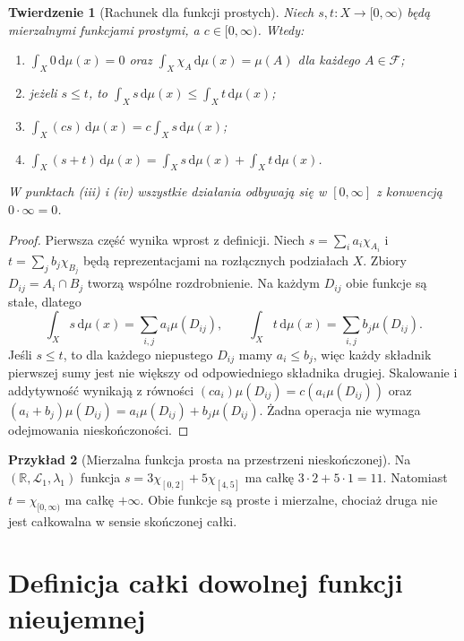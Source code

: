 \documentclass[11pt,a4paper,oneside]{book}
\numberwithin{equation}{chapter}
\theoremstyle{plain}
\newtheorem{twierdzenie}{Twierdzenie}[chapter]
\theoremstyle{definition}
\newtheorem{przyklad}[twierdzenie]{Przykład}
\theoremstyle{remark}
\begin{document}
\begin{twierdzenie}[Rachunek dla funkcji prostych]
\label{thm:simple-properties}
Niech $s,t:X\to[0,\infty)$ będą mierzalnymi funkcjami
prostymi, a $c\in[0,\infty)$. Wtedy:
\begin{enumerate}[label=\textup{(\roman*)}]
\item $\int_X0\,\mathrm d\mu(x)=0$ oraz
$\int_X\chi_A\,\mathrm d\mu(x)=\mu(A)$ dla każdego
$A\in\mathcal F$;
\item jeżeli $s\le t$, to
$\int_Xs\,\mathrm d\mu(x)\le\int_Xt\,\mathrm d\mu(x)$;
\item $\int_X(cs)\,\mathrm d\mu(x)=c\int_Xs\,\mathrm d\mu(x)$;
\item $\int_X(s+t)\,\mathrm d\mu(x)=
\int_Xs\,\mathrm d\mu(x)+\int_Xt\,\mathrm d\mu(x)$.
\end{enumerate}
W punktach (iii) i (iv) wszystkie działania odbywają się
w $[0,\infty]$ z konwencją $0\cdot\infty=0$.
\end{twierdzenie}
\begin{proof}
Pierwsza część wynika wprost z definicji. Niech
$s=\sum_i a_i\chi_{A_i}$ i
$t=\sum_j b_j\chi_{B_j}$ będą reprezentacjami
na rozłącznych podziałach $X$. Zbiory
$D_{ij}=A_i\cap B_j$ tworzą wspólne rozdrobnienie.
Na każdym $D_{ij}$ obie funkcje są stałe, dlatego
\[
\int_Xs\,\mathrm d\mu(x)=\sum_{i,j}a_i\mu(D_{ij}),\qquad
\int_Xt\,\mathrm d\mu(x)=\sum_{i,j}b_j\mu(D_{ij}).
\]
Jeśli $s\le t$, to dla każdego niepustego $D_{ij}$
mamy $a_i\le b_j$, więc każdy składnik pierwszej sumy
jest nie większy od odpowiedniego składnika drugiej.
Skalowanie i addytywność wynikają z równości
$(ca_i)\mu(D_{ij})=c(a_i\mu(D_{ij}))$ oraz
$(a_i+b_j)\mu(D_{ij})=a_i\mu(D_{ij})+b_j\mu(D_{ij})$.
Żadna operacja nie wymaga odejmowania nieskończoności.
\end{proof}

\begin{przyklad}[Mierzalna funkcja prosta na przestrzeni nieskończonej]
Na $(\mathbb R,\mathcal L_1,\lambda_1)$ funkcja
$s=3\chi_{[0,2]}+5\chi_{[4,5]}$ ma całkę
$3\cdot2+5\cdot1=11$. Natomiast
$t=\chi_{[0,\infty)}$ ma całkę $+\infty$.
Obie funkcje są proste i mierzalne, chociaż druga
nie jest całkowalna w sensie skończonej całki.
\end{przyklad}

\section{Definicja całki dowolnej funkcji nieujemnej}
\end{document}
